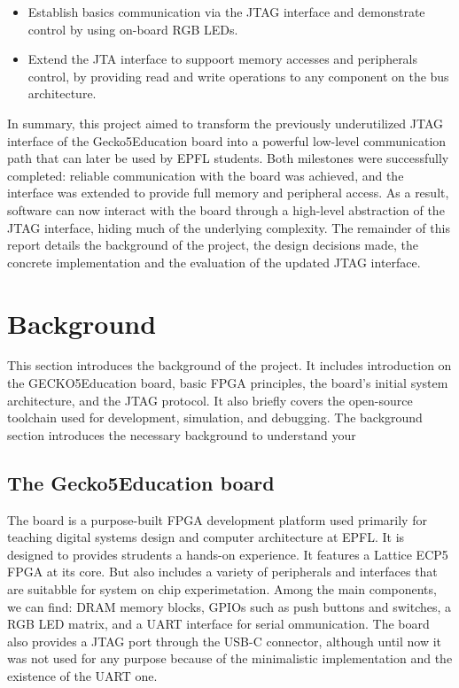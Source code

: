 \documentclass[a4paper,11pt,oneside]{report}
\newcommand{\boardName}{Gecko5Education \xspace}
\begin{document}
\begin{itemize}
    \item Establish basics communication via the JTAG interface and demonstrate control by using 
    on-board RGB LEDs.
    \item Extend the JTA interface to suppoort memory accesses and peripherals control, by providing read and write
    operations to any component on the bus architecture.
\end{itemize}

In summary, this project aimed to transform the previously underutilized JTAG interface of the \boardName board into a powerful low-level communication path
that can later be used by EPFL students. 
Both milestones were successfully completed: reliable communication with the board was achieved, 
and the interface was extended to provide full memory and peripheral access. As a result, 
software can now interact with the board through a high-level abstraction of the JTAG interface, hiding much of the underlying complexity.
The remainder of this report details the background of the project, the design decisions made, the concrete implementation and the evaluation of the updated JTAG interface.


\chapter{Background}

This section introduces the background of the project. It includes introduction on the GECKO5Education board, basic FPGA principles, the board’s initial system architecture, and the JTAG protocol.
It also briefly covers the open-source toolchain used for development, simulation, and debugging.
The background section introduces the necessary background to understand your

\section{The \boardName board}
\label{sec:board}

The \boardname board is a purpose-built FPGA development platform used primarily 
for teaching digital systems design and computer architecture at EPFL.
It is designed to provides strudents a hands-on experience. It features a Lattice ECP5 FPGA at its core. 
But also includes a variety of peripherals and interfaces that are suitabble for system on chip experimetation.
Among the main components, we can find: DRAM memory blocks, GPIOs such as push buttons and switches, a RGB LED matrix,
 and a UART interface for serial ommunication.
The board also provides a JTAG port through the USB-C connector, although until now it was not used for any purpose because of
the minimalistic implementation and the existence of the UART one.
\end{document}
